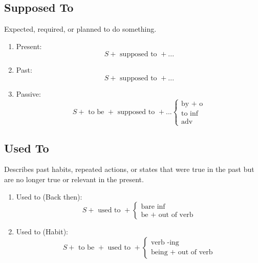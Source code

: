 \subsection{Supposed To}
\begin{definition}[Supposed To]
  Expected, required, or planned to do something.
\end{definition}
\begin{enumerate}
\item Present:
  $$S + \text{ supposed to } + ...$$
\item Past:
  $$S + \text{ supposed to } + ...$$
\item Passive:
  $$
  S + \text{ to be } + \text{ supposed to } + ...
  \begin{cases}
    \text{by + o} \\
    \text{to inf} \\
    \text{adv}
  \end{cases}
  $$
\end{enumerate}

\subsection{Used To}
\begin{definition}[Used To]
  Describes past habits, repeated actions, or states that were true in the past but are no longer true or relevant in the present.
\end{definition}
\begin{enumerate}
\item Used to (Back then):
  $$
  S + \text{ used to } +
  \begin{cases}
    \text{bare inf} \\
    \text{be } + \text{ out of verb}
  \end{cases}
  $$
\item Used to (Habit):
  $$
  S + \text{ to be } + \text{ used to } +
  \begin{cases}
    \text{verb -ing} \\
    \text{being } + \text{ out of verb}
  \end{cases}
  $$
\end{enumerate}

